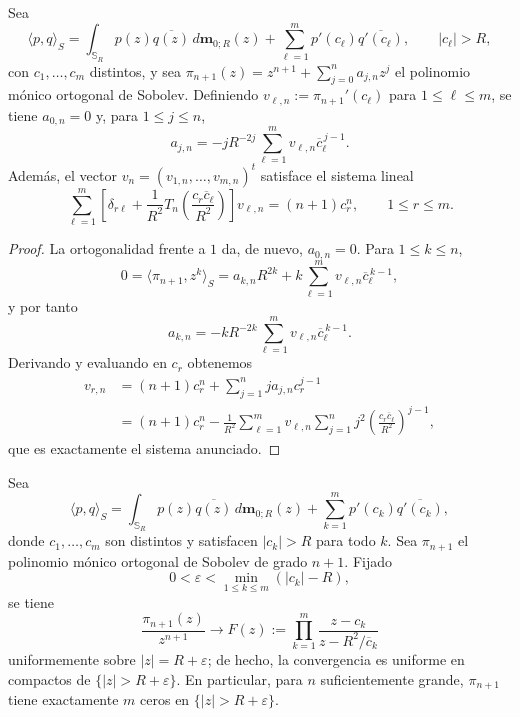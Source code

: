 \begin{lem}\label{lem:sistema_finito_atraccion}
	Sea
	\[
		\langle p,q\rangle_S
		=
		\int_{\mathbb S_R}p(z)\overline{q(z)}\,d\mathbf m_{0;R}(z)
		+
		\sum_{\ell=1}^m p'(c_\ell)\overline{q'(c_\ell)},
		\qquad |c_\ell|>R,
	\]
	con $c_1,\dots,c_m$ distintos, y sea $\pi_{n+1}(z)=z^{n+1}+\sum_{j=0}^n a_{j,n}z^j$ el polinomio mónico ortogonal de Sobolev.
	Definiendo $v_{\ell,n}:=\pi_{n+1}'(c_\ell)$ para $1\le \ell\le m$,
	se tiene $a_{0,n}=0$ y, para $1\le j\le n$,
	\[
		a_{j,n}=-jR^{-2j}\sum_{\ell=1}^m v_{\ell,n}\overline c_\ell^{\,j-1}.
	\]
	Además, el vector $v_n=(v_{1,n},\dots,v_{m,n})^t$ satisface el sistema lineal
	\[
		\sum_{\ell=1}^m
		\left[
			\delta_{r\ell}+
			\frac1{R^2}T_n\!\left(\frac{c_r\overline c_\ell}{R^2}\right)
			\right]v_{\ell,n}
		=(n+1)c_r^n,
		\qquad 1\le r\le m.
	\]
\end{lem}

\begin{proof}
	La ortogonalidad frente a $1$ da, de nuevo, $a_{0,n}=0$. Para $1\le k\le n$,
	\[
		0=\langle \pi_{n+1},z^k\rangle_S
		=a_{k,n}R^{2k}+k\sum_{\ell=1}^m v_{\ell,n}\overline c_\ell^{\,k-1},
	\]
	y por tanto
	\[
		a_{k,n}=-kR^{-2k}\sum_{\ell=1}^m v_{\ell,n}\overline c_\ell^{\,k-1}.
	\]
	Derivando y evaluando en $c_r$ obtenemos
	\begin{align*}
		v_{r,n}
		 & =(n+1)c_r^n+\sum_{j=1}^n ja_{j,n}c_r^{j-1} \\
		 & =(n+1)c_r^n-
		\frac1{R^2}
		\sum_{\ell=1}^m v_{\ell,n}
		\sum_{j=1}^n j^2\left(\frac{c_r\overline c_\ell}{R^2}\right)^{j-1},
	\end{align*}
	que es exactamente el sistema anunciado.
\end{proof}

\begin{lem}\label{lem:conteo_exterior_reciproco}
	Sea
	\[
		\langle p,q\rangle_S
		=
		\int_{\mathbb S_R}p(z)\overline{q(z)}\,d\mathbf m_{0;R}(z)
		+
		\sum_{k=1}^m p'(c_k)\overline{q'(c_k)},
	\]
	donde $c_1,\dots,c_m$ son distintos y satisfacen $|c_k|>R$ para todo $k$. Sea $\pi_{n+1}$ el polinomio mónico ortogonal de Sobolev de grado $n+1$. Fijado
	\[
		0<\varepsilon<\min_{1\le k\le m}(|c_k|-R),
	\]
	se tiene
	\[
		\frac{\pi_{n+1}(z)}{z^{n+1}}
		\longrightarrow
		F(z):=\prod_{k=1}^m\frac{z-c_k}{z-R^2/\overline c_k}
	\]
	uniformemente sobre $|z|=R+\varepsilon$; de hecho, la convergencia es uniforme en compactos de $\{|z|>R+\varepsilon\}$. En particular, para $n$ suficientemente grande, $\pi_{n+1}$ tiene exactamente $m$ ceros en $\{|z|>R+\varepsilon\}$.
\end{lem}

